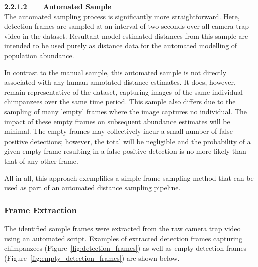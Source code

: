 \vspace{3mm}

\textbf{2.2.1.2~~~~Automated Sample}\vspace{4.5mm}\\
The automated sampling process is significantly more straightforward.
Here, detection frames are sampled at an interval of two seconds over all camera trap video in
the dataset.
Resultant model-estimated distances from this sample are intended to be used purely as distance
data for the automated modelling of population abundance.

In contrast to the manual sample, this automated sample is not directly associated with any
human-annotated distance estimates.
It does, however, remain representative of the dataset, capturing images of the same individual
chimpanzees over the same time period.
This sample also differs due to the sampling of many 'empty' frames where the image captures no
individual.
The impact of these empty frames on subsequent abundance estimates will be minimal.
The empty frames may collectively incur a small number of false positive detections; however,
the total will be negligible and the probability of a given empty frame resulting in a false
positive detection is no more likely than that of any other frame.

All in all, this approach exemplifies a simple frame sampling method that can be used as part of
an automated distance sampling pipeline.

\vspace{-2.5mm}

\subsubsection{Frame Extraction}
The identified sample frames were extracted from the raw camera trap video using an automated
script.
Examples of extracted detection frames capturing chimpanzees (Figure~\ref{fig:detection_frames})
as well as empty detection frames (Figure~\ref{fig:empty_detection_frames}) are shown below.

\vspace{1cm}

